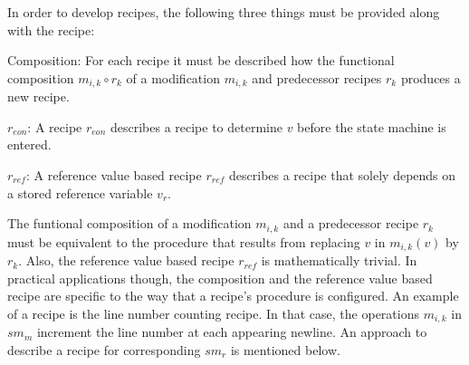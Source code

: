\documentclass[12pt,a4paper]{scrartcl}
\begin{document}
In order to develop recipes, the following three things must be provided along
with the recipe:
    
\begin{description}

   \item{Composition:} For each recipe it must be described how the functional
       composition $m_{i,k}\circ r_k$ of a modification $m_{i,k}$ and predecessor
       recipes $r_k$ produces a new recipe. 

   \item{$r_{eon}$:} A recipe $r_{eon}$ describes a recipe to determine $v$
       before the state machine is entered. 

   \item{$r_{ref}$:} A reference value based recipe $r_{ref}$ describes a
       recipe that solely depends on a stored reference variable $v_r$.

\end{description}

The funtional composition of a modification $m_{i,k}$ and a predecessor recipe
$r_k$ must be equivalent to the procedure that results from replacing $v$ in
$m_{i,k}(v)$ by $r_k$. Also, the reference value based recipe $r_{ref}$ is
mathematically trivial. In practical applications though, the composition and
the reference value based recipe are specific to the way that a recipe's
procedure is configured.  An example of a recipe is the line number counting
recipe. In that case, the operations $m_{i,k}$ in $sm_m$ increment the line
number at each appearing newline.  An approach to describe a recipe for
corresponding $sm_r$ is mentioned below. 
\end{document}
